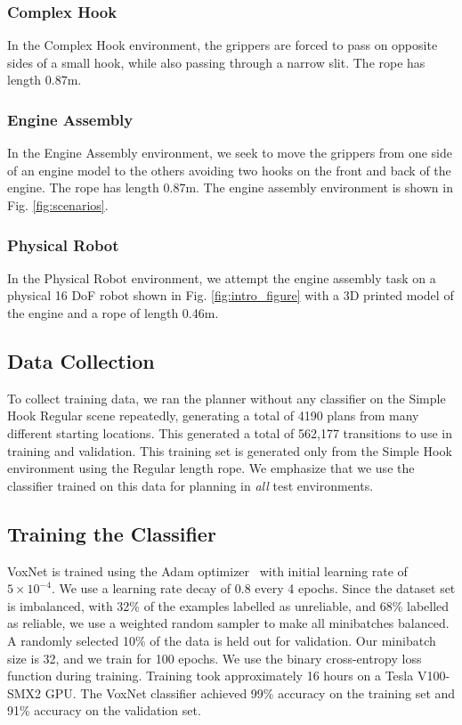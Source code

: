\subsubsection{Complex Hook}

In the Complex Hook environment, the grippers are forced to pass on opposite sides of a small hook, while also passing through a narrow slit. The rope has length 0.87m.


\subsubsection{Engine Assembly}
In the Engine Assembly environment, we seek to move the grippers from one side of an engine model \cite{EngineAssemblyTumber} to the others avoiding two hooks on the front and back of the engine. The rope has length 0.87m.
 The engine assembly environment is shown in Fig. \ref{fig:scenarios}.

\subsubsection{Physical Robot}
In the Physical Robot environment, we attempt the engine assembly task on a physical 16 DoF robot shown in Fig. \ref{fig:intro_figure} with a 3D printed model of the engine and a rope of length 0.46m.


\subsection{Data Collection}

\label{sec:ropedata}
To collect training data, we ran the planner without any classifier on the Simple Hook Regular scene repeatedly, generating a total of 4190 plans from many different starting locations. This generated a total of 562,177 transitions to use in training and validation. This training set is generated only from the Simple Hook environment using the Regular length rope. We emphasize that we use the classifier trained on this data for planning in \textit{all} test environments. %


\subsection{Training the Classifier}

VoxNet is trained using the Adam optimizer~\cite{adamOptimizer2015} with initial learning rate of $5 \times 10^{-4}$. We use a learning rate decay of $0.8$ every 4 epochs. Since the dataset set is imbalanced, with 32\% of the examples labelled as unreliable, and 68\% labelled as reliable, we use a weighted random sampler to make all minibatches balanced. A randomly selected 10\% of the data is held out for validation. Our minibatch size is 32, and we train for 100 epochs. We use the binary cross-entropy loss function during training. Training took approximately 16 hours on a Tesla V100-SMX2 GPU. The VoxNet classifier achieved 99\% accuracy on the training set and 91\% accuracy on the validation set. 



